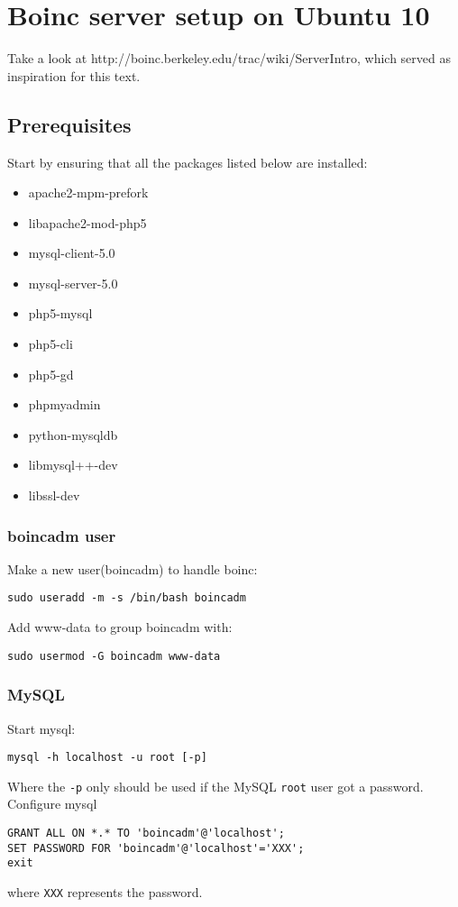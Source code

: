 \documentclass{article}
\begin{document}
\section{Boinc server setup on Ubuntu 10}
Take a look at http://boinc.berkeley.edu/trac/wiki/ServerIntro, which served as inspiration for this text.
%
\subsection{Prerequisites}
Start by ensuring that all the packages listed below are installed:
\begin{itemize}
\item apache2-mpm-prefork
\item libapache2-mod-php5
\item mysql-client-5.0
\item mysql-server-5.0
\item php5-mysql
\item php5-cli
\item php5-gd
\item phpmyadmin
\item python-mysqldb
\item libmysql++-dev
\item libssl-dev
\end{itemize}
%
\subsubsection{boincadm user}
Make a new user(boincadm) to handle boinc:
\begin{verbatim}
sudo useradd -m -s /bin/bash boincadm
\end{verbatim}
%
Add www-data to group boincadm with:
\begin{verbatim}
sudo usermod -G boincadm www-data
\end{verbatim}
%
\subsubsection{MySQL}
Start mysql:
\begin{verbatim}
mysql -h localhost -u root [-p]
\end{verbatim}
Where the \texttt{-p} only should be used if the MySQL \texttt{root} user got a password.
%
Configure mysql
\begin{verbatim}
GRANT ALL ON *.* TO 'boincadm'@'localhost';
SET PASSWORD FOR 'boincadm'@'localhost'='XXX';
exit
\end{verbatim}
%
where \texttt{XXX} represents the password.
%
\end{document}
